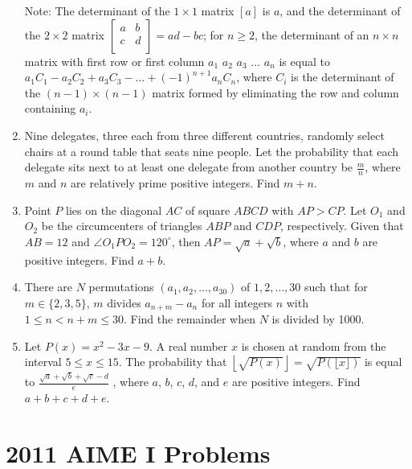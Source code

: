 \documentclass{article}
\begin{document}
\begin{enumerate}[label=\arabic*., itemsep=0.5em]
Note: The determinant of the \(1 \times 1\) matrix \([a]\) is \(a\), and the determinant of the \(2 \times 2\) matrix \(\left[ {\begin{array}{cc}
 a & b  \\
 c & d  \\
 \end{array} } \right] = ad - bc\); for \(n \ge 2\), the determinant of an \(n \times n\) matrix with first row or first column \(a_1\) \(a_2\) \(a_3\) \(\dots\) \(a_n\) is equal to \(a_1C_1 - a_2C_2 + a_3C_3 - \dots + (-1)^{n+1}a_nC_n\), where \(C_i\) is the determinant of the \((n - 1) \times (n - 1)\) matrix formed by eliminating the row and column containing \(a_i\).\par \vspace{0.5em}\item Nine delegates, three each from three different countries, randomly select chairs at a round table that seats nine people. Let the probability that each delegate sits next to at least one delegate from another country be \(\frac{m}{n}\), where \(m\) and \(n\) are relatively prime positive integers. Find \(m + n\).\par \vspace{0.5em}\item Point \(P\) lies on the diagonal \(AC\) of square \(ABCD\) with \(AP > CP\). Let \(O_1\) and \(O_2\) be the circumcenters of triangles \(ABP\) and \(CDP\), respectively. Given that \(AB = 12\) and \(\angle O_1PO_2 = 120 ^{\circ}\), then \(AP = \sqrt{a} + \sqrt{b}\), where \(a\) and \(b\) are positive integers. Find \(a + b\).\par \vspace{0.5em}\item There are \(N\) permutations \((a_1, a_2, \dots, a_{30})\) of \(1, 2, \dots, 30\) such that for \(m \in \{2,3,5\}\), \(m\) divides \(a_{n+m} - a_n\) for all integers \(n\) with \(1 \le n < n+m \le 30\). Find the remainder when \(N\) is divided by 1000.\par \vspace{0.5em}\item Let \(P(x) = x^2 - 3x - 9\). A real number \(x\) is chosen at random from the interval \(5 \le x \le 15\). The probability that \(\left\lfloor\sqrt{P(x)}\right\rfloor = \sqrt{P(\lfloor x \rfloor)}\) is equal to \(\frac{\sqrt{a} + \sqrt{b} + \sqrt{c} - d}{e}\) , where \(a\), \(b\), \(c\), \(d\), and \(e\) are positive integers. Find \(a + b + c + d + e\).\par \vspace{0.5em}\end{enumerate}\newpage\section*{2011 AIME I Problems}
\end{document}
